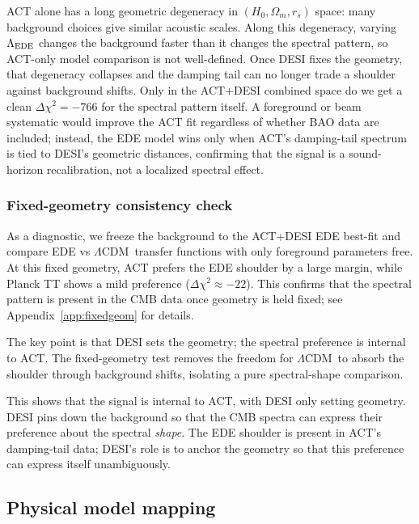 \documentclass[twocolumn,showpacs,preprintnumbers,amsmath,amssymb,prd]{revtex4-2}
\newcommand{\lcdm}{$\Lambda$CDM}
\begin{document}
ACT alone has a long geometric degeneracy in $(H_0, \Omega_m, r_s)$ space: 
many background choices give similar acoustic scales. Along this degeneracy, 
varying $\Lambda_{\rm EDE}$ changes the background faster than it changes the 
spectral pattern, so ACT-only model comparison is not well-defined. Once DESI 
fixes the geometry, that degeneracy collapses and the damping tail can no longer 
trade a shoulder against background shifts. Only in the ACT+DESI combined space 
do we get a clean $\Delta\chi^2 = -766$ for the spectral pattern itself. 
A foreground or beam systematic would improve the ACT fit regardless of whether 
BAO data are included; instead, the EDE model wins only when ACT's damping-tail 
spectrum is tied to DESI's geometric distances, confirming that the signal is a 
sound-horizon recalibration, not a localized spectral effect.

\subsubsection{Fixed-geometry consistency check}
\label{sec:fixed_geometry}

As a diagnostic, we freeze the background to the ACT+DESI EDE best-fit and 
compare EDE vs \lcdm\ transfer functions with only foreground parameters free. 
At this fixed geometry, ACT prefers the EDE shoulder by a large margin, while 
Planck TT shows a mild preference ($\Delta\chi^2 \approx -22$). This confirms 
that the spectral pattern is present in the CMB data once geometry is held 
fixed; see Appendix~\ref{app:fixedgeom} for details.

The key point is that DESI sets the geometry; the spectral preference is 
internal to ACT. The fixed-geometry test removes the freedom for \lcdm\ to 
absorb the shoulder through background shifts, isolating a pure spectral-shape 
comparison.

This shows that the signal is internal to ACT, with DESI only setting 
geometry. DESI pins down the background so that the CMB spectra can express 
their preference about the spectral \emph{shape}. The EDE shoulder is present 
in ACT's damping-tail data; DESI's role is to anchor the geometry so that 
this preference can express itself unambiguously.

\subsection{Physical model mapping}
\label{sec:free_lambda}
\end{document}
